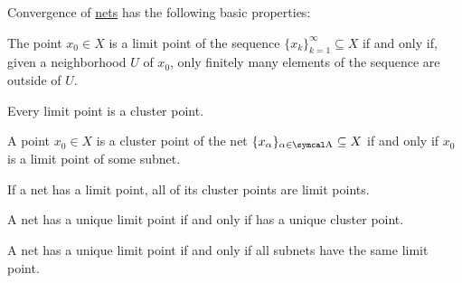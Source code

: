 \begin{proposition}\label{thm:net_convergence_properties}
  Convergence of \hyperref[def:net_convergence]{nets} has the following basic properties:

  \begin{propenum}
     The point \( x_0 \in X \) is a limit point of the sequence \( \{ x_k \}_{k=1}^\infty \subseteq X \) if and only if, given a neighborhood \( U \) of \( x_0 \), only finitely many elements of the sequence are outside of \( U \).

     Every limit point is a cluster point.

     A point \( x_0 \in X \) is a cluster point of the net \( \{ x_\al \}_{\al \in \CA} \subseteq X \) if and only if \( x_0 \) is a limit point of some subnet.

     If a net has a limit point, all of its cluster points are limit points.

     A net has a unique limit point if and only if has a unique cluster point.

     A net has a unique limit point if and only if all subnets have the same limit point.
  \end{propenum}
\end{proposition}
